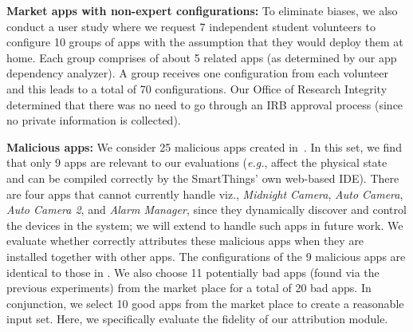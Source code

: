 \hfill \break

{\bf Market apps with non-expert configurations:}
To eliminate biases, we also conduct a user study where we request 7 independent student volunteers
to configure 10 groups of apps with the assumption that they would deploy them at home.
Each group comprises of about 5 related apps (as determined by our app dependency analyzer).
A group receives one configuration from each volunteer and this leads to a total of 70 configurations.
Our Office of Research Integrity determined that
there was no need to go through an IRB approval process (since no private information is collected).

{\bf Malicious apps:}
We consider 25 malicious apps created in~\cite{Jia:contexiot}.
In this set, we find that only 9 apps are relevant
to our evaluations (\textit{e.g.}, affect the physical state and can be compiled correctly by the SmartThings' own web-based IDE).
There are four apps that \sys cannot currently handle viz., \textit{Midnight Camera}, \textit{Auto Camera}, \textit{Auto Camera 2}, and \textit{Alarm Manager}, since they dynamically discover and control the devices in the system; we will extend \sys to handle such apps in future work.
We evaluate whether \sys correctly attributes these malicious apps when they are installed together with other apps.
The configurations of the 9 malicious apps are identical to those
in \cite{Jia:contexiot}. We also choose 11 potentially bad apps (found via the previous experiments) from the market place 
for a total of 20 bad apps. In conjunction, we select 10 good apps from the market place to create a reasonable input set. Here, we specifically evaluate the fidelity of our attribution module. %

